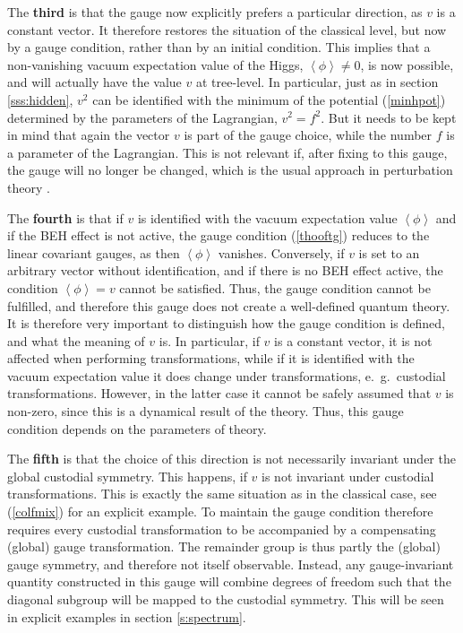 \documentclass[final,12pt]{article}
\newcommand*{\pref}[1]{(\ref{#1})}
\newcommand*{\1}{1\!\!\!\bot}
\newcommand*{\la}{\left\langle}
\newcommand*{\ra}{\right\rangle}
\begin{document}
The {\bf third} is that the gauge now explicitly prefers a particular direction, as $v$ is a constant vector. It therefore restores the situation of the classical level, but now by a gauge condition, rather than by an initial condition. This implies that a non-vanishing vacuum expectation value of the Higgs, $\la \phi\ra\neq 0$, is now possible, and will actually have the value $v$ at tree-level. In particular, just as in section \ref{sss:hidden}, $v^2$ can be identified with the minimum of the potential \pref{minhpot} determined by the parameters of the Lagrangian, $v^2=f^2$. But it needs to be kept in mind that again the vector $v$ is part of the gauge choice, while the number $f$ is a parameter of the Lagrangian. This is not relevant if, after fixing to this gauge, the gauge will no longer be changed, which is the usual approach in perturbation theory \cite{Bohm:2001yx}.

The {\bf fourth} is that if $v$ is identified with the vacuum expectation value $\la\phi\ra$ and if the BEH effect is not active, the gauge condition \pref{thooftg} reduces to the linear covariant gauges, as then $\la\phi\ra$ vanishes. Conversely, if $v$ is set to an arbitrary vector without identification, and if there is no BEH effect active, the condition $\la\phi\ra=v$ cannot be satisfied. Thus, the gauge condition cannot be fulfilled, and therefore this gauge does not create a well-defined quantum theory. It is therefore very important to distinguish how the gauge condition is defined, and what the meaning of $v$ is. In particular, if $v$ is a constant vector, it is not affected when performing transformations, while if it is identified with the vacuum expectation value it does change under transformations, e.\ g.\ custodial transformations. However, in the latter case it cannot be safely assumed that $v$ is non-zero, since this is a dynamical result of the theory. Thus, this gauge condition depends on the parameters of theory.

The {\bf fifth} is that the choice of this direction is not necessarily invariant under the global custodial symmetry. This happens, if $v$ is not invariant under custodial transformations. This is exactly the same situation as in the classical case, see \pref{colfmix} for an explicit example. To maintain the gauge condition therefore requires every custodial transformation to be accompanied by a compensating (global) gauge transformation. The remainder group is thus partly the (global) gauge symmetry, and therefore not itself observable. Instead, any gauge-invariant quantity constructed in this gauge will combine degrees of freedom such that the diagonal subgroup will be mapped to the custodial symmetry. This will be seen in explicit examples in section \ref{s:spectrum}.
\end{document}
